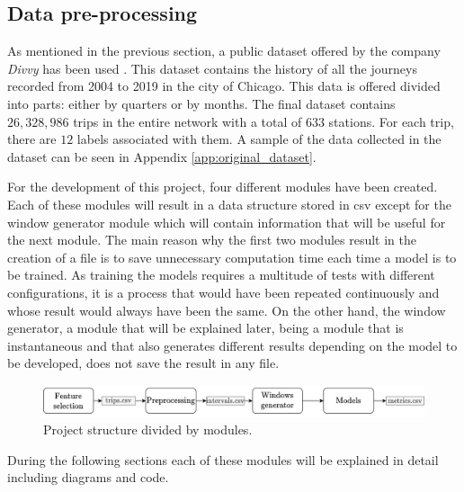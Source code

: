 \subsection{Data pre-processing}

As mentioned in the previous section, a public dataset offered by the company \textit{Divvy} has been used \cite{divvy}. This dataset contains the history of all the journeys recorded from 2004 to 2019 in the city of Chicago. This data is offered divided into parts: either by quarters or by months. The final dataset contains $26,328,986$ trips in the entire network with a total of $633$ stations. For each trip, there are $12$ labels associated with them. A sample of the data collected in the dataset can be seen in Appendix \ref{app:original_dataset}.
\newline


For the development of this project, four different modules have been created. Each of these modules will result in a data structure stored in \acrshort{csv} except for the window generator module which will contain information that will be useful for the next module. The main reason why the first two modules result in the creation of a file is to save unnecessary computation time each time a model is to be trained. As training the models requires a multitude of tests with different configurations, it is a process that would have been repeated continuously and whose result would always have been the same. On the other hand, the window generator, a module that will be explained later, being a module that is instantaneous and that also generates different results depending on the model to be developed, does not save the result in any file.
\newline

\begin{figure}[H]
    \centering
    \includegraphics[width=15cm]{images/solution/modules/modules.png}
    \caption{Project structure divided by modules.}
\end{figure}

During the following sections each of these modules will be explained in detail including diagrams and code.



